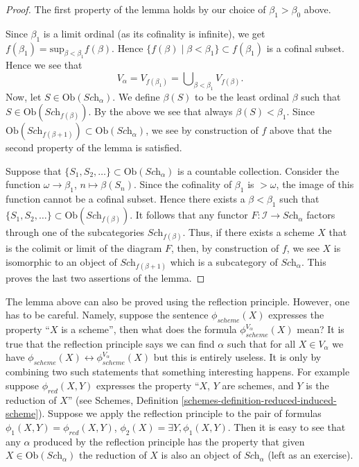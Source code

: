 \begin{proof}
\medskip\noindent
The first property of the lemma holds by our choice
of $\beta_1 > \beta_0$ above.

\medskip\noindent
Since $\beta_1$ is a limit ordinal (as its cofinality is infinite),
we get $f(\beta_1) = \text{sup}_{\beta < \beta_1} f(\beta)$.
Hence $\{f(\beta) \mid \beta < \beta_1\} \subset f(\beta_1)$ is a
cofinal subset. Hence we see that
$$
V_\alpha = V_{f(\beta_1)} = \bigcup\nolimits_{\beta < \beta_1} V_{f(\beta)}.
$$
Now, let $S \in \text{Ob}(\textit{Sch}_\alpha)$. We define
$\beta(S)$ to be the least ordinal $\beta$ such that
$S \in \text{Ob}(\textit{Sch}_{f(\beta)})$. By the above we see
that always $\beta(S) < \beta_1$. Since
$\text{Ob}(\textit{Sch}_{f(\beta + 1)}) \subset
\text{Ob}(\textit{Sch}_\alpha)$, we
see by construction of $f$ above that the second property of the lemma
is satisfied.

\medskip\noindent
Suppose that $\{S_1, S_2, \ldots\} \subset \text{Ob}(\textit{Sch}_\alpha)$
is a countable collection. Consider the function
$\omega \to \beta_1$, $n \mapsto \beta(S_n)$. Since the cofinality
of $\beta_1$ is $> \omega$, the image of this function cannot be a
cofinal subset. Hence there exists a $\beta < \beta_1$ such
that $\{S_1, S_2, \ldots\} \subset \text{Ob}(\textit{Sch}_{f(\beta)})$.
It follows that any functor $F : \mathcal{I} \to \textit{Sch}_\alpha$
factors through one of the subcategories $\textit{Sch}_{f(\beta)}$.
Thus, if there exists a scheme $X$ that is the colimit or limit
of the diagram $F$, then, by construction of $f$, we see
$X$ is isomorphic to an object
of $\textit{Sch}_{f(\beta + 1)}$ which is a subcategory of
$\textit{Sch}_\alpha$. This proves the last two assertions of
the lemma.
\end{proof}

\begin{remark}
\label{remark-how-to-use-reflection}
The lemma above can also be proved using the reflection principle.
However, one has to be careful. Namely, suppose the sentence
$\phi_{scheme}(X)$ expresses the property ``$X$ is a scheme'', then
what does the formula $\phi_{scheme}^{V_\alpha}(X)$ mean?
It is true that the reflection principle says we can find $\alpha$ such that
for all $X \in V_\alpha$ we have
$\phi_{scheme}(X) \leftrightarrow \phi_{scheme}^{V_\alpha}(X)$
but this is entirely useless. It is only by combining two such
statements that something interesting happens. For example suppose
$\phi_{red}(X, Y)$ expresses the property ``$X$, $Y$ are schemes,
and $Y$ is the reduction of $X$'' (see
Schemes, Definition \ref{schemes-definition-reduced-induced-scheme}).
Suppose we apply the reflection principle to the pair of
formulas $\phi_1(X, Y) = \phi_{red}(X, Y)$,
$\phi_2(X) = \exists Y, \phi_1(X, Y)$. Then it is easy to see that
any $\alpha$ produced by the reflection principle has the property that
given $X \in \text{Ob}(\textit{Sch}_\alpha)$ the reduction of
$X$ is also an object of $\textit{Sch}_\alpha$ (left as an exercise).
\end{remark}

